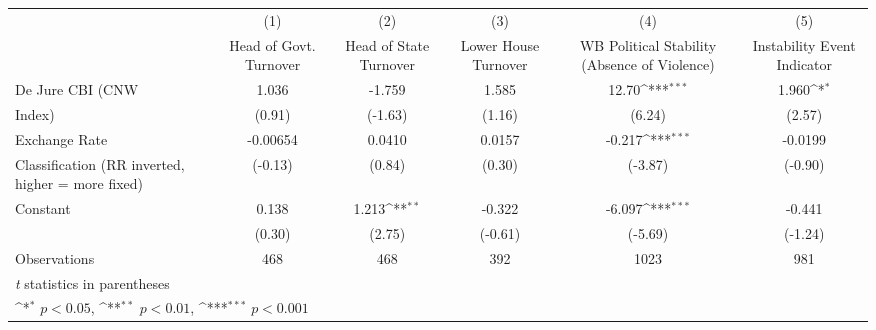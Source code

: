 {
\def\sym#1{\ifmmode^{#1}\else\(^{#1}\)\fi}
\begin{tabular}{l*{5}{c}}
\toprule
                &\multicolumn{1}{c}{(1)}&\multicolumn{1}{c}{(2)}&\multicolumn{1}{c}{(3)}&\multicolumn{1}{c}{(4)}&\multicolumn{1}{c}{(5)}\\
                &\multicolumn{1}{c}{Head of Govt. Turnover}&\multicolumn{1}{c}{Head of State Turnover}&\multicolumn{1}{c}{Lower House Turnover}&\multicolumn{1}{c}{WB Political Stability (Absence of Violence)}&\multicolumn{1}{c}{Instability Event Indicator}\\
\midrule
De Jure CBI (CNW&    1.036         &   -1.759         &    1.585         &    12.70\sym{***}&    1.960\sym{*}  \\
Index)          &   (0.91)         &  (-1.63)         &   (1.16)         &   (6.24)         &   (2.57)         \\
\addlinespace
Exchange Rate   & -0.00654         &   0.0410         &   0.0157         &   -0.217\sym{***}&  -0.0199         \\
Classification (RR inverted, higher = more fixed)&  (-0.13)         &   (0.84)         &   (0.30)         &  (-3.87)         &  (-0.90)         \\
\addlinespace
Constant        &    0.138         &    1.213\sym{**} &   -0.322         &   -6.097\sym{***}&   -0.441         \\
                &   (0.30)         &   (2.75)         &  (-0.61)         &  (-5.69)         &  (-1.24)         \\
\midrule
Observations    &      468         &      468         &      392         &     1023         &      981         \\
\bottomrule
\multicolumn{6}{l}{\footnotesize \textit{t} statistics in parentheses}\\
\multicolumn{6}{l}{\footnotesize \sym{*} \(p<0.05\), \sym{**} \(p<0.01\), \sym{***} \(p<0.001\)}\\
\end{tabular}
}

